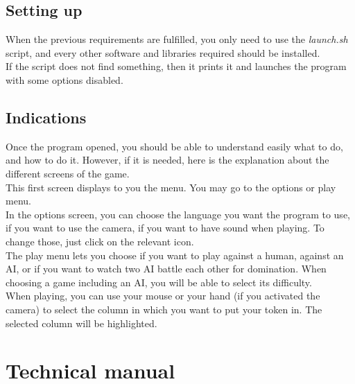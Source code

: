 \documentclass[12pt, a4paper, oneside]{report}
\begin{document}
	\section{Setting up}
	When the previous requirements are fulfilled, you only need to use the \textit{launch.sh} script, and every other software and libraries required should be installed. \\
	If the script does not find something, then it prints it and launches the program with some options disabled.

	\section{Indications}
	Once the program opened, you should be able to understand easily what to do, and how to do it. However, if it is needed, here is the explanation about the different screens of the game. \\

	This first screen displays to you the menu. You may go to the options or play menu. \\
	\hspace*{1cm} In the options screen, you can choose the language you want the program to use, if you want to use the camera, if you want to have sound when playing. To change those, just click on the relevant icon. \\
	\hspace*{1cm} The play menu lets you choose if you want to play against a human, against an AI, or if you want to watch two AI battle each other for domination. When choosing a game including an AI, you will be able to select its difficulty. \\

	When playing, you can use your mouse or your hand (if you activated the camera) to select the column in which you want to put your token in. The selected column will be highlighted.

	\chapter{Technical manual}
\end{document}
